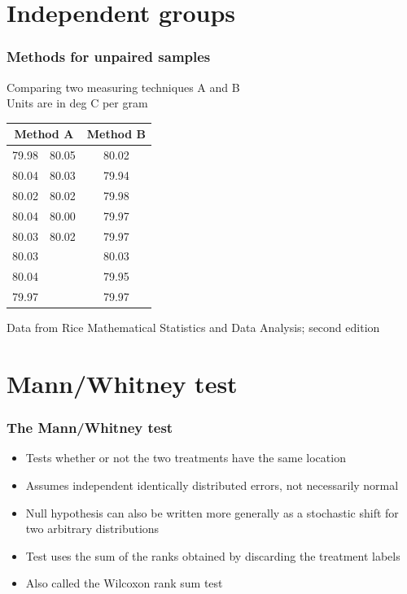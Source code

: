 \documentclass[aspectratio=169]{beamer}
\begin{document}
\section{Independent groups}
\begin{frame}\frametitle{Methods for unpaired samples} 
Comparing two measuring techniques A and B\\
Units are in deg C per gram
\begin{center}
\ttfamily
  \begin{tabular}{|cc|c|} \hline
\multicolumn{2}{|c|}{Method A} & Method B \\ \hline
79.98 & 80.05 & 80.02 \\
80.04 & 80.03 & 79.94 \\
80.02 & 80.02 & 79.98 \\
80.04 & 80.00 & 79.97 \\
80.03 & 80.02 & 79.97 \\
80.03 &       & 80.03 \\
80.04 &       & 79.95 \\
79.97 &       & 79.97 \\ \hline
  \end{tabular}
\end{center}
Data from Rice Mathematical Statistics and Data Analysis; second edition \normalsize \normalfont
\end{frame}

\section{Mann/Whitney test}
\begin{frame}\frametitle{The Mann/Whitney test}
\begin{itemize}
\item Tests whether or not the two treatments have the same location
\item Assumes independent identically distributed errors, not necessarily normal
\item Null hypothesis can also be written more generally as a stochastic shift for
  two arbitrary distributions
\item Test uses the sum of the ranks obtained by discarding the
  treatment labels
\item Also called the Wilcoxon rank sum test
\end{itemize}
\end{frame}
\end{document}

